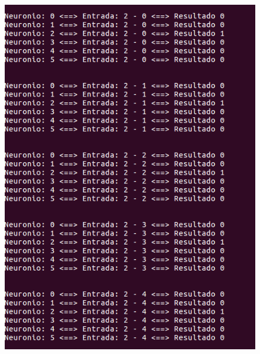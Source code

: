 \documentclass[hidelinks,12pt]{article}
\begin{document}
		\begin{figure}[!h]
			\centering
			\includegraphics[scale=0.5]{Figures/E3S2P1.png}
		\end{figure}
		
\end{document}
